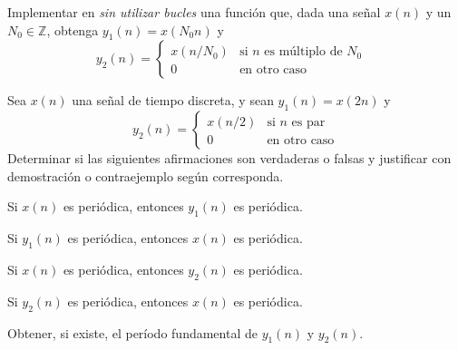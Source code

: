 \begin{ejercicio}
    Implementar en \Keyboardsym \emph{sin utilizar bucles} una función que, dada una señal $x(n)$ y un $N_0\in \mathbb{Z}$, obtenga $y_1(n)=x(N_0n)$ y 
    \begin{equation*}
    y_2(n) = \begin{cases}
    x(n/N_0) & \mbox{si $n$ es múltiplo de $N_0$ } \\
    0 & \mbox{en otro caso}
    \end{cases}
    \end{equation*}
\end{ejercicio}

\begin{ejercicio}
Sea $x(n)$ una señal de tiempo discreta, y sean $y_1(n) = x(2 n)$ y 
\begin{equation*}
y_2(n) = \begin{cases}
x(n/2) & \mbox{si $n$ es par} \\
0 & \mbox{en otro caso}
\end{cases}
\end{equation*}
\hspace*{-1.5ex}\inciso Determinar si las siguientes afirmaciones son verdaderas o falsas y justificar con demostración o contraejemplo según corresponda.

\vspace*{1.5ex}

\hspace*{0.1em} \subinciso Si $x(n)$ es periódica, entonces $y_1(n)$ es periódica.

\hspace*{0.1em} \subinciso Si $y_1(n)$ es periódica, entonces $x(n)$ es periódica.

\hspace*{0.1em} \subinciso Si $x(n)$ es periódica, entonces $y_2(n)$ es periódica.

\hspace*{0.1em} \subinciso Si $y_2(n)$ es periódica, entonces $x(n)$ es periódica.

\inciso Obtener, si existe, el período fundamental de $y_1(n)$ y $y_2(n)$.

\end{ejercicio}

